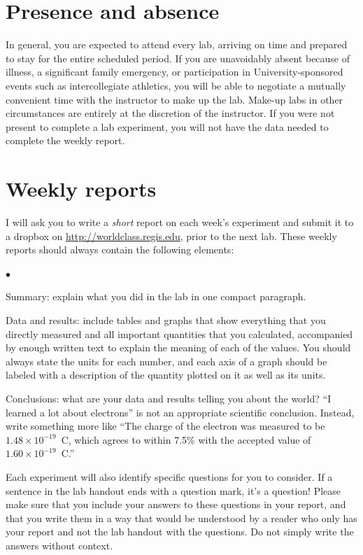 \documentclass[11pt]{article}
\newcommand{\squishlist}{
   \begin{list}{$\bullet$}
    { \setlength{\itemsep}{0pt}      \setlength{\parsep}{3pt}
      \setlength{\topsep}{3pt}       \setlength{\partopsep}{0pt}
      \setlength{\leftmargin}{1.5em} \setlength{\labelwidth}{1em}
      \setlength{\labelsep}{0.5em} } }
\newcommand{\squishend}{
    \end{list}  }
\begin{document}
\section{Presence and absence}

In general, you are expected to attend every lab, arriving on time and prepared to stay for the entire scheduled period.
If you are unavoidably absent because of illness, a significant family emergency, or participation in University-sponsored
events such as intercollegiate athletics, you will be able to negotiate a mutually convenient time with the instructor to make up 
the lab.  Make-up labs in other circumstances are entirely at the discretion of the instructor.  If you were not present to
complete a lab experiment, you will not have the data needed to complete the weekly report.

\section{Weekly reports}

I will ask you to write a {\em short} report on each week's experiment and 
submit it to a dropbox on \url{http://worldclass.regis.edu},
prior to the next lab.
These weekly reports should always contain the following elements:
\squishlist
\item Summary: explain what you did in the lab in one compact paragraph.
\item Data and results: include tables and graphs that show everything 
  that you directly measured and all important quantities that you calculated,
  accompanied by enough written text to explain the meaning of each of the 
  values.  You should always state the units for each number, and each axis 
  of a graph should be labeled with a description of the quantity plotted on 
  it as well as its units.
\item Conclusions: what are your data and results telling you about the world?
  ``I learned a lot about electrons'' is not an appropriate scientific conclusion.  
  Instead, write something more like ``The charge of the electron was measured to be $1.48 \times 10^{-19}$~C, which agrees to within 7.5\% with the accepted value of $1.60 \times 10^{-19}$~C.''
\squishend

Each experiment will also identify specific questions for you to consider.  
If a sentence in the lab handout ends with a question mark, it's a question!
Please make sure that you include your answers to these questions in your 
report, and that you write them in a way that would be understood by a reader 
who only has your report and not the lab handout with the questions.
Do not simply write the answers without context.
\end{document}
